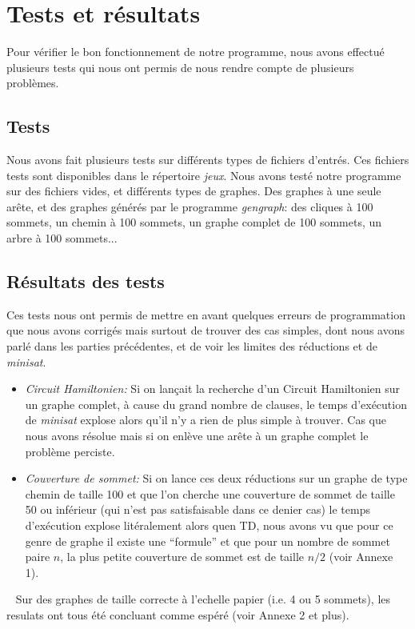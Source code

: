 \section{Tests et résultats}
  Pour vérifier le bon fonctionnement de notre programme, nous avons
  effectué plusieurs tests qui nous ont permis de nous rendre compte de
  plusieurs problèmes.

  \subsection{Tests}
  Nous avons fait plusieurs tests sur différents types de fichiers
  d'entrés. Ces fichiers tests sont disponibles dans le répertoire
  \emph{jeux}. \newline
  \indent Nous avons testé notre programme sur des fichiers vides,
  et différents types de graphes. Des graphes à une seule arête, et des
  graphes générés par le programme \emph{gengraph}: des cliques à 100
  sommets, un chemin à 100 sommets, un graphe complet de 100 sommets, un
  arbre à 100 sommets...

  \subsection{Résultats des tests}
  Ces tests nous ont permis de mettre en avant quelques erreurs de
  programmation que nous avons corrigés mais surtout de trouver des cas
  simples, dont nous avons parlé dans les parties précédentes, et de
  voir les limites des réductions et de \emph{minisat}.\newline
  \begin{itemize}
   \item \emph{Circuit Hamiltonien:} Si on lançait la recherche d'un
	 Circuit Hamiltonien sur un graphe complet, à cause du grand
	 nombre de clauses, le temps d'exécution de \emph{minisat}
	 explose alors qu'il n'y a rien de plus simple à trouver. Cas
	 que nous avons résolue mais si on enlève une arête à un graphe
	 complet le problème perciste.\\
   \item \emph{Couverture de sommet:} Si on lance ces deux
	 réductions sur un graphe de type chemin de taille 100 et que
	 l'on cherche une couverture de sommet de taille 50 ou
	 inférieur (qui n'est pas satisfaisable dans ce denier cas) le
	 temps d'exécution explose litéralement alors quen TD, nous
	 avons vu que pour ce genre de graphe il existe une ``formule''
	 et que pour un nombre de sommet paire $n$, la plus petite
	 couverture de sommet est de taille $n/2$ (voir Annexe 1).
  \end{itemize}
  ~\newline
  \indent Sur des graphes de taille correcte à l'echelle papier (i.e. 4 ou 5
  sommets), les resulats ont tous été concluant comme espéré (voir
  Annexe 2 et plus).